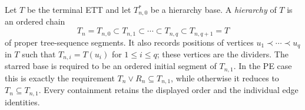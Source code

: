 \begin{definition}
Let $T$ be the terminal ETT and let $T_{n,0}^{*}$ be a hierarchy base.
A \emph{hierarchy} of $T$ is an ordered chain
\[
 T_n=T_{n,0}\subset T_{n,1}\subset\cdots\subset
 T_{n,q}\subset T_{n,q+1}=T
\]
of proper tree-sequence segments.  It also records positions of vertices
$u_1\prec\cdots\prec u_q$ in $T$ such that
$T_{n,i}=T(u_i)$ for $1\leq i\leq q$; these vertices are the dividers.
The starred base is required to be an ordered initial segment of
$T_{n,1}$.  In the PE case this is exactly the requirement
$T_n\vee R_n\subseteq T_{n,1}$, while otherwise it reduces to
$T_n\subseteq T_{n,1}$.  Every containment retains the displayed order
and the individual edge identities.
\end{definition}
